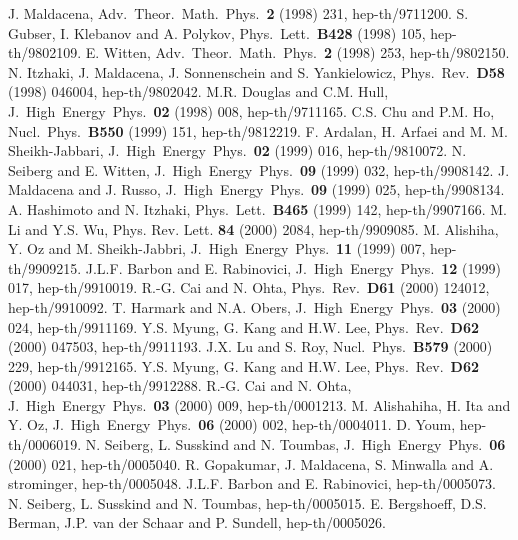 \documentclass[a4paper,12pt]{article}
\begin{document}
\providecommand{\ATMP}[1]{Adv.\ Theor.\ Math.\ Phys.\ {\bf #1}}
\providecommand{\NP}[1]{Nucl.\ Phys.\ {\bf #1}}
\providecommand{\PL}[1]{Phys.\ Lett.\ {\bf #1}}
\providecommand{\PR}[1]{Phys.\ Rev.\ {\bf #1}}
\providecommand{\IJMP}[1]{Int.\ Jour.\ Mod.\ Phys.\ {\bf #1}}
\providecommand{\JHEP}[1]{J.\ High\ Energy\ Phys.\ {\bf #1}}
\begin{thebibliography}{99}
 J. Maldacena, \ATMP{2} (1998) 231, hep-th/9711200.
 S. Gubser, I. Klebanov and A. Polykov, \PL{B428}
 (1998) 105, hep-th/9802109.
 E. Witten, \ATMP{2} (1998) 253, hep-th/9802150.
 N. Itzhaki, J. Maldacena, J. Sonnenschein and
 S. Yankielowicz, \PR{D58} (1998) 046004, hep-th/9802042.
 M.R. Douglas and C.M. Hull, \JHEP{02} (1998) 008,
 hep-th/9711165.
 C.S. Chu and P.M. Ho, \NP{B550} (1999) 151, hep-th/9812219.
 F. Ardalan, H. Arfaei and M. M. Sheikh-Jabbari,
 \JHEP{02} (1999) 016, hep-th/9810072.
 N. Seiberg and E. Witten, \JHEP{09} (1999) 032, hep-th/9908142.
 J. Maldacena and J. Russo, \JHEP{09} (1999) 025,
 hep-th/9908134.
 A. Hashimoto and N. Itzhaki, \PL{B465} (1999) 142,
 hep-th/9907166.
 M. Li and Y.S. Wu, Phys. Rev. Lett. {\bf 84} (2000) 2084,
 hep-th/9909085.
 M. Alishiha, Y. Oz and M. Sheikh-Jabbri, \JHEP{11}
 (1999) 007, hep-th/9909215.
 J.L.F. Barbon and E. Rabinovici, \JHEP{12}
 (1999) 017, hep-th/9910019.
 R.-G. Cai and N. Ohta, \PR{D61} (2000) 124012, hep-th/9910092.
 T. Harmark and N.A. Obers, \JHEP{03} (2000) 024, hep-th/9911169.
 Y.S. Myung, G. Kang and H.W. Lee, \PR{D62} (2000)
  047503, hep-th/9911193.
 J.X. Lu and S. Roy, \NP{B579} (2000) 229, hep-th/9912165.
 Y.S. Myung, G. Kang and H.W. Lee, \PR{D62}
 (2000) 044031, hep-th/9912288.
 R.-G. Cai and N. Ohta, \JHEP{03} (2000) 009, hep-th/0001213.
 M. Alishahiha, H. Ita and Y. Oz, \JHEP{06} (2000) 002,
 hep-th/0004011.
 D. Youm, hep-th/0006019.
 N. Seiberg, L. Susskind and N. Toumbas, \JHEP{06} (2000) 021,
 hep-th/0005040.
 R. Gopakumar, J. Maldacena, S. Minwalla and A. strominger,
 hep-th/0005048.
 J.L.F. Barbon and E. Rabinovici, hep-th/0005073.
 N. Seiberg, L. Susskind and N. Toumbas, hep-th/0005015.
 E. Bergshoeff, D.S. Berman, J.P. van der Schaar and P.
 Sundell, hep-th/0005026.

\end{thebibliography}
\end{document}

